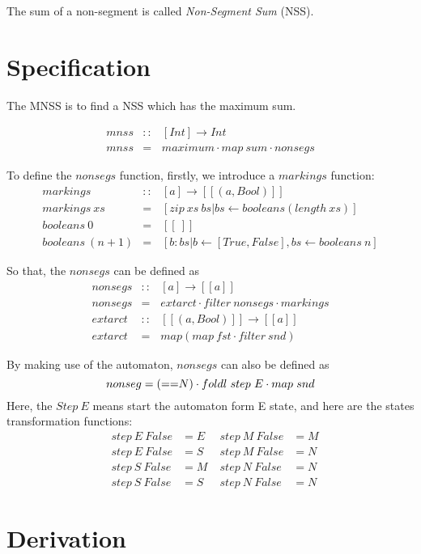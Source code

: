 \documentclass[10pt,a4paper]{article}
\begin{document}
The sum of a non-segment is called \textsl{Non-Segment Sum} (NSS).

\section{Specification}
The MNSS is to find a NSS which has the maximum sum.

\[
\begin{array}{lll}
mnss &::& [Int] \rightarrow Int \\
mnss &=& maximum \cdot map ~ sum \cdot nonsegs
\end{array}
\]

To define the \(nonsegs\) function, firstly, we introduce a $markings$ function:
\[
\begin{array}{lll}
markings  &::& [a] \rightarrow [[(a,Bool)]] \\
markings ~xs &=& [zip ~ xs ~ bs | bs \leftarrow booleans(length ~ xs)] \\
booleans ~ 0 &=& [[~]] \\
booleans ~ (n+1) &=&  [b:bs | b \leftarrow [True,False], bs \leftarrow booleans ~n]
\end{array}
\]

So that, the $nonsegs$ can be defined as 
\[
\begin{array}{lll}
nonsegs &::& [a] \rightarrow [[a]] \\
nonsegs &=& extarct \cdot filter ~ nonsegs \cdot markings \\
extarct &::& [[(a, Bool)]] \rightarrow [[a]] \\
extarct &=& map(map ~ fst \cdot filter ~ snd)
\end{array}
\] 

By making use of the automaton, $nonsegs$ can also be defined as
\[
nonseg  =  (\small{==} N) \cdot foldl~step~E \cdot map ~ snd
\]
Here, the \( Step ~ E\) means start the automaton form E state, and here are the states transformation functions:
\[
\begin{array}{lllll}
&step ~ E ~ False &= E \;  &step ~ M ~ False &= M  \\
&step ~ E ~ False &= S \;  &step ~ M ~ False &= N  \\
&step ~ S ~ False &= M \;  &step ~ N ~ False &= N  \\
&step ~ S ~ False &= S \;  &step ~ N ~ False &= N 
\end{array}
\]

\section{Derivation}
\end{document}

